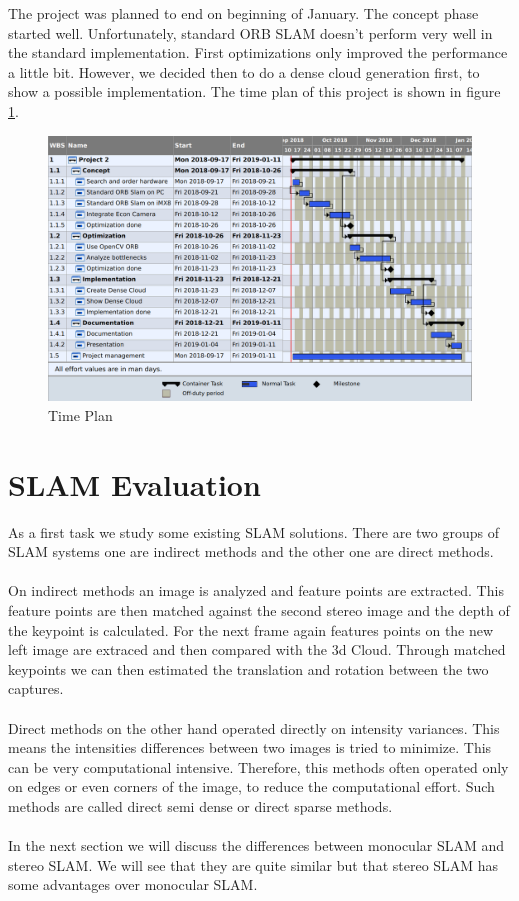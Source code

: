 \documentclass[11pt,a4paper,titlepage,oneside]{report}
\begin{document}
The project was planned to end on beginning of January. The concept phase started well. Unfortunately, standard ORB SLAM doesn't perform very well in the standard implementation. First optimizations only improved the performance a little bit. However, we decided then to do a dense cloud generation first, to show a possible implementation. The time plan of this project is shown in figure \ref{fig:timeplan}.
\begin{figure}[H]
	\includegraphics[width=1.0\textwidth]{img/timeplan.png}
	\caption{Time Plan}\label{fig:timeplan}
\end{figure}

\chapter{SLAM Evaluation}

As a first task we study some existing SLAM solutions. There are two groups of SLAM systems one are indirect methods and the other one are direct methods.\\\\
On indirect methods an image is analyzed and feature points are extracted. This feature points are then matched against the second stereo image and the depth of the keypoint is calculated. For the next frame again features points on the new left image are extraced and then compared with the 3d Cloud. Through matched keypoints we can then estimated the translation and rotation between the two captures.\\\\
Direct methods on the other hand operated directly on intensity variances. This means the intensities differences between two images is tried to minimize. This can be very computational intensive. Therefore, this methods often operated only on edges or even corners of the image, to reduce the computational effort. Such methods are called direct semi dense or direct sparse methods.\\\\
In the next section we will discuss the differences between monocular SLAM and stereo SLAM. We will see that they are quite similar but that stereo SLAM has some advantages over monocular SLAM.
\end{document}
